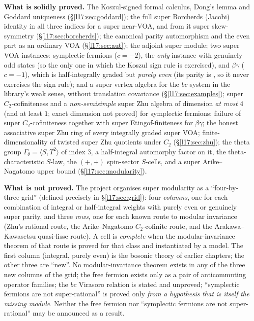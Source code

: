 \textbf{What is solidly proved.} The Koszul-signed formal calculus, Dong's lemma and Goddard
uniqueness (§\ref{l17:sec:goddard}); the full super Borcherds (Jacobi) identity in all three indices
for a super near-VOA, and from it super skew-symmetry (§\ref{l17:sec:borcherds}); the canonical
parity automorphism and the even part as an ordinary VOA (§\ref{l17:sec:aut}); the adjoint super
module; two super VOA instances: symplectic fermions ($c=-2$), the \emph{only} instance with genuinely odd states (so the
only one in which the Koszul sign rule is exercised), and $\beta\gamma$ ($c=-1$), which is half-integrally graded but
\emph{purely even} (its parity is , so it never exercises the sign rule); and a super vertex algebra
for the $bc$ system in the library's weak sense, without translation covariance (§\ref{l17:sec:examples}); super
$C_2$-cofiniteness and a \emph{non-semisimple} super Zhu algebra of dimension \emph{at most} $4$ (and at least $1$; exact
dimension not proved) for symplectic fermions; failure of super
$C_2$-cofiniteness together with super Etingof-finiteness for $\beta\gamma$; the honest associative
super Zhu ring of every integrally graded super VOA; finite-dimensionality of twisted super Zhu
quotients under $C_2$ (§\ref{l17:sec:zhu}); the theta group $\Gamma_\theta=\langle S,T^2\rangle$ of
index $3$, a half-integral automorphy factor on it, the theta-characteristic $S$-law, the $(+,+)$
spin-sector $S$-cells, and a super Arike--Nagatomo upper bound (§\ref{l17:sec:modularity}).

\textbf{What is not proved.} The project organises super modularity as a ``four-by-three grid''
(defined precisely in §\ref{l17:sec:grid}): four \emph{columns}, one for each combination of
integral or half-integral weights with purely even or genuinely super parity, and three \emph{rows},
one for each known route to modular invariance (Zhu's rational route, the Arike--Nagatomo
$C_2$-cofinite route, and the Arakawa--Kawasetsu quasi-lisse route). A cell is \emph{complete} when
the modular-invariance theorem of that route is proved for that class and instantiated by a model.
The first column (integral, purely even) is the bosonic theory of earlier chapters; the other three
are ``new''. No modular-invariance theorem exists in any of the three new columns of the grid; the free fermion exists only as a pair of
anticommuting operator families; the $bc$ Virasoro relation is stated and unproved; ``symplectic
fermions are not super-rational'' is proved only \emph{from a hypothesis that is itself the missing
module}. Neither the free fermion nor ``symplectic fermions are not super-rational'' may be announced as a result.

